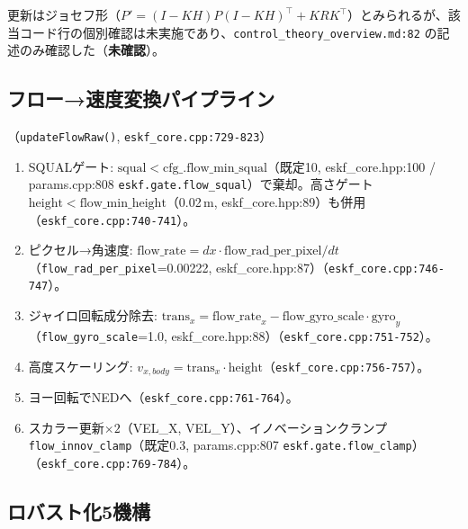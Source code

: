 \documentclass[a4paper,10pt]{ltjsarticle}
\begin{document}
更新はジョセフ形（$P' = (I-KH)P(I-KH)^\top + KRK^\top$）とみられるが、該当コード行の個別確認は未実施であり、\texttt{control\_theory\_overview.md:82} の記述のみ確認した（\textbf{未確認}）。

\subsection{フロー→速度変換パイプライン}（\texttt{updateFlowRaw()}, \texttt{eskf\_core.cpp:729-823}）

\begin{enumerate}[leftmargin=*]
  \item SQUALゲート: $\mathrm{squal} < \mathrm{cfg\_.flow\_min\_squal}$（既定10, eskf\_core.hpp:100 / params.cpp:808 \texttt{eskf.gate.flow\_squal}）で棄却。高さゲート $\mathrm{height} < \mathrm{flow\_min\_height}$（0.02\,m, eskf\_core.hpp:89）も併用（\texttt{eskf\_core.cpp:740-741}）。
  \item ピクセル→角速度: $\mathrm{flow\_rate} = dx \cdot \mathrm{flow\_rad\_per\_pixel}/dt$（\texttt{flow\_rad\_per\_pixel}=0.00222, eskf\_core.hpp:87）（\texttt{eskf\_core.cpp:746-747}）。
  \item ジャイロ回転成分除去: $\mathrm{trans}_x = \mathrm{flow\_rate}_x - \mathrm{flow\_gyro\_scale} \cdot \mathrm{gyro}_y$（\texttt{flow\_gyro\_scale}=1.0, eskf\_core.hpp:88）（\texttt{eskf\_core.cpp:751-752}）。
  \item 高度スケーリング: $v_{x,body} = \mathrm{trans}_x \cdot \mathrm{height}$（\texttt{eskf\_core.cpp:756-757}）。
  \item ヨー回転でNEDへ（\texttt{eskf\_core.cpp:761-764}）。
  \item スカラー更新$\times2$（VEL\_X, VEL\_Y）、イノベーションクランプ \texttt{flow\_innov\_clamp}（既定0.3, params.cpp:807 \texttt{eskf.gate.flow\_clamp}）（\texttt{eskf\_core.cpp:769-784}）。
\end{enumerate}

\subsection{ロバスト化5機構}
\end{document}
